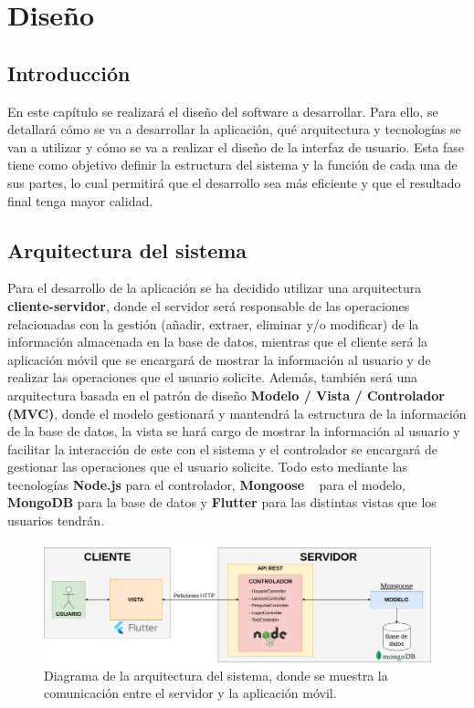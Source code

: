 \chapter{Diseño}

\section{Introducción}
En este capítulo se realizará el diseño del software a desarrollar. Para ello, se detallará cómo se va a desarrollar la aplicación, qué arquitectura y tecnologías se van a utilizar y cómo se va a realizar el diseño de la interfaz de usuario. 
Esta fase tiene como objetivo definir la estructura del sistema y la función de cada una de sus partes, lo cual permitirá que el desarrollo sea más eficiente y que el resultado final tenga mayor calidad.

\section{Arquitectura del sistema}
Para el desarrollo de la aplicación se ha decidido utilizar una arquitectura \textbf{cliente-servidor}, donde el servidor será responsable de las operaciones relacionadas con la gestión (añadir, extraer, eliminar y/o modificar) de la información almacenada en la base de datos, mientras que el cliente será 
la aplicación móvil que se encargará de mostrar la información al usuario y de realizar las operaciones que el usuario solicite. Además, también será una arquitectura basada en el patrón de diseño \textbf{Modelo / Vista / Controlador (MVC)}, donde el modelo gestionará y mantendrá la estructura de la información
de la base de datos, la vista se hará cargo de mostrar la información al usuario y facilitar la interacción de este con el sistema y el controlador se encargará de gestionar las operaciones que el usuario solicite. Todo esto mediante las tecnologías \textbf{Node.js} para el controlador, \textbf{Mongoose} ~\cite{mongoose} para
el modelo, \textbf{MongoDB} para la base de datos y \textbf{Flutter} para las distintas vistas que los usuarios tendrán. 

\begin{figure}[H]
    \centering
    \centerline{\includegraphics[width=1.1\textwidth]{imagenes/c6/arch.png}}
    \caption{Diagrama de la arquitectura del sistema, donde se muestra la comunicación entre el servidor y la aplicación móvil.}
    \label{fig:diagramadearquitectura}    
\end{figure}

